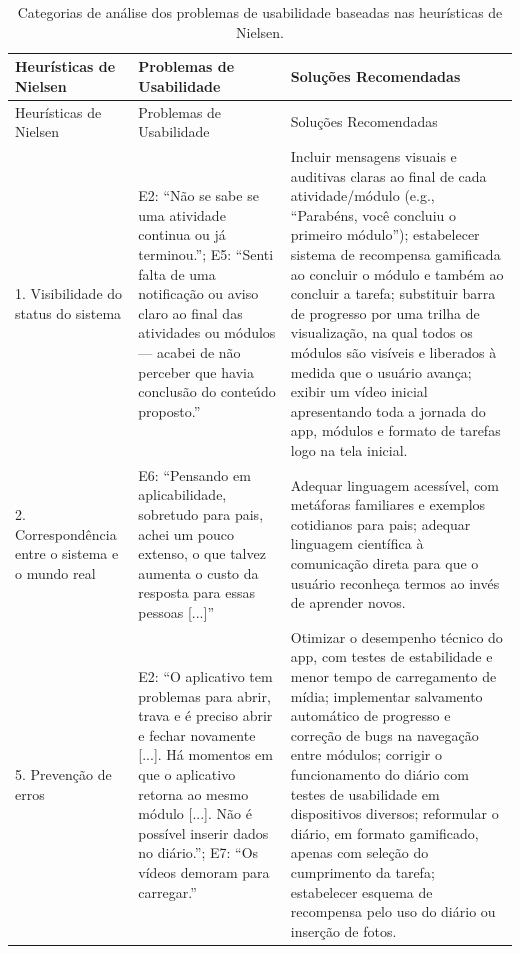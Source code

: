 \documentclass[portuguese]{textolivre}
\begin{document}
\begin{longtable}{p{2.5cm}p{5cm}p{6cm}}
\caption{Categorias de análise dos problemas de usabilidade baseadas nas heurísticas de Nielsen.}
\label{tab4} \\
\toprule
Heurísticas de Nielsen &
Problemas de Usabilidade &
Soluções Recomendadas \\
\midrule
\endfirsthead

\midrule
Heurísticas de Nielsen&
Problemas de Usabilidade&
Soluções Recomendadas\\
\endhead

1. Visibilidade do status do sistema &
E2: “Não se sabe se uma atividade continua ou já terminou.”; E5: “Senti falta de uma notificação ou aviso claro ao final das atividades ou módulos — acabei de não perceber que havia conclusão do conteúdo proposto.” &
Incluir mensagens visuais e auditivas claras ao final de cada atividade/módulo (e.g., “Parabéns, você concluiu o primeiro módulo”); estabelecer sistema de recompensa gamificada ao concluir o módulo e também ao concluir a tarefa; substituir barra de progresso por uma trilha de visualização, na qual todos os módulos são visíveis e liberados à medida que o usuário avança; exibir um vídeo inicial apresentando toda a jornada do app, módulos e formato de tarefas logo na tela inicial. \\
\hline

2. Correspondência entre o sistema e o mundo real &
E6: “Pensando em aplicabilidade, sobretudo para pais, achei um pouco extenso, o que talvez aumenta o custo da resposta para essas pessoas [...]” &
Adequar linguagem acessível, com metáforas familiares e exemplos cotidianos para pais; adequar linguagem científica à comunicação direta para que o usuário reconheça termos ao invés de aprender novos. \\
\hline

5. Prevenção de erros &
E2: “O aplicativo tem problemas para abrir, trava e é preciso abrir e fechar novamente [...]. Há momentos em que o aplicativo retorna ao mesmo módulo [...]. Não é possível inserir dados no diário.”; E7: “Os vídeos demoram para carregar.” &
Otimizar o desempenho técnico do app, com testes de estabilidade e menor tempo de carregamento de mídia; implementar salvamento automático de progresso e correção de bugs na navegação entre módulos; corrigir o funcionamento do diário com testes de usabilidade em dispositivos diversos; reformular o diário, em formato gamificado, apenas com seleção do cumprimento da tarefa; estabelecer esquema de recompensa pelo uso do diário ou inserção de fotos. \\
\hline


\end{longtable}
\end{document}
